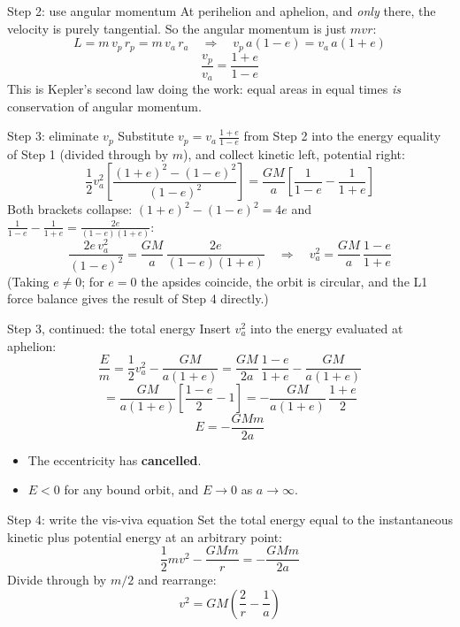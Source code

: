 \documentclass[aspectratio=169, 11pt]{beamer}
\begin{document}
\begin{frame}{Step 2: use angular momentum}
  At perihelion and aphelion, and \emph{only} there, the velocity is purely tangential. So the angular momentum is just $m v r$:
  \[
    L = m\, v_p\, r_p = m\, v_a\, r_a
    \quad \Longrightarrow \quad
    v_p\, a(1-e) = v_a\, a(1+e)
  \]
  \vskip6pt\relax
  \[
    \frac{v_p}{v_a} = \frac{1+e}{1-e}
  \]
  \vskip6pt\relax
  This is Kepler's second law doing the work: equal areas in equal times \emph{is} conservation of angular momentum.
\end{frame}

\begin{frame}{Step 3: eliminate $v_p$}
  Substitute $v_p = v_a\,\frac{1+e}{1-e}$ from Step 2 into the energy equality of Step 1 (divided through by $m$), and collect kinetic left, potential right:
  \[
    \frac{1}{2}v_a^2\left[\frac{(1+e)^2 - (1-e)^2}{(1-e)^2}\right] = \frac{GM}{a}\left[\frac{1}{1-e} - \frac{1}{1+e}\right]
  \]
  \vskip4pt\relax
  Both brackets collapse: $(1+e)^2 - (1-e)^2 = 4e$ and $\frac{1}{1-e} - \frac{1}{1+e} = \frac{2e}{(1-e)(1+e)}$:
  \[
    \frac{2e\,v_a^2}{(1-e)^2} = \frac{GM}{a}\,\frac{2e}{(1-e)(1+e)}
    \quad \Longrightarrow \quad
    v_a^2 = \frac{GM}{a}\,\frac{1-e}{1+e}
  \]
  \vskip4pt\relax
  {\footnotesize (Taking $e \neq 0$; for $e = 0$ the apsides coincide, the orbit is circular, and the L1 force balance gives the result of Step 4 directly.)}
\end{frame}

\begin{frame}{Step 3, continued: the total energy}
  Insert $v_a^2$ into the energy evaluated at aphelion:
  \[
    \frac{E}{m} = \frac{1}{2}v_a^2 - \frac{GM}{a(1+e)}
    = \frac{GM}{2a}\,\frac{1-e}{1+e} - \frac{GM}{a(1+e)}
  \]
  \[
    = \frac{GM}{a(1+e)}\left[\frac{1-e}{2} - 1\right]
    = -\frac{GM}{a(1+e)}\,\frac{1+e}{2}
  \]
  \vskip6pt\relax
  \[
    \boxed{\; E = -\frac{GMm}{2a} \;}
  \]
  \vskip6pt\relax
  \begin{itemize}
    \item The eccentricity has \textbf{cancelled}.
    \item $E < 0$ for any bound orbit, and $E \to 0$ as $a \to \infty$.
  \end{itemize}
\end{frame}

\begin{frame}{Step 4: write the vis-viva equation}
  Set the total energy equal to the instantaneous kinetic plus potential energy at an arbitrary point:
  \[
    \frac{1}{2}mv^2 - \frac{GMm}{r} = -\frac{GMm}{2a}
  \]
  \vskip4pt\relax
  Divide through by $m/2$ and rearrange:
  \vskip4pt\relax
  \[
    \boxed{\; v^2 = GM\left(\frac{2}{r} - \frac{1}{a}\right) \;}
  \]
  \vskip8pt\relax
\end{frame}
\end{document}
